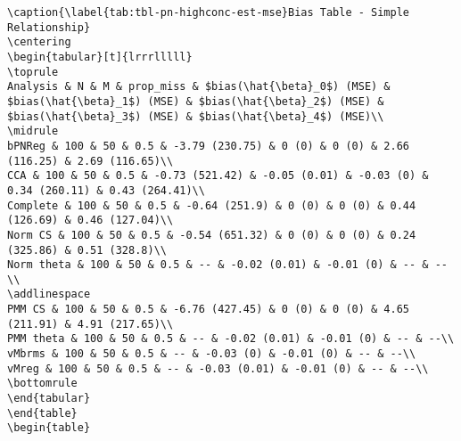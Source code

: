 \documentclass[
]{article}
\begin{document}
\begin{table}
\begin{minipage}[t]{\linewidth}
{\begin{verbatim}
\caption{\label{tab:tbl-pn-highconc-est-mse}Bias Table - Simple Relationship}
\centering
\begin{tabular}[t]{lrrrlllll}
\toprule
Analysis & N & M & prop_miss & $bias(\hat{\beta}_0$) (MSE) & $bias(\hat{\beta}_1$) (MSE) & $bias(\hat{\beta}_2$) (MSE) & $bias(\hat{\beta}_3$) (MSE) & $bias(\hat{\beta}_4$) (MSE)\\
\midrule
bPNReg & 100 & 50 & 0.5 & -3.79 (230.75) & 0 (0) & 0 (0) & 2.66 (116.25) & 2.69 (116.65)\\
CCA & 100 & 50 & 0.5 & -0.73 (521.42) & -0.05 (0.01) & -0.03 (0) & 0.34 (260.11) & 0.43 (264.41)\\
Complete & 100 & 50 & 0.5 & -0.64 (251.9) & 0 (0) & 0 (0) & 0.44 (126.69) & 0.46 (127.04)\\
Norm CS & 100 & 50 & 0.5 & -0.54 (651.32) & 0 (0) & 0 (0) & 0.24 (325.86) & 0.51 (328.8)\\
Norm theta & 100 & 50 & 0.5 & -- & -0.02 (0.01) & -0.01 (0) & -- & --\\
\addlinespace
PMM CS & 100 & 50 & 0.5 & -6.76 (427.45) & 0 (0) & 0 (0) & 4.65 (211.91) & 4.91 (217.65)\\
PMM theta & 100 & 50 & 0.5 & -- & -0.02 (0.01) & -0.01 (0) & -- & --\\
vMbrms & 100 & 50 & 0.5 & -- & -0.03 (0) & -0.01 (0) & -- & --\\
vMreg & 100 & 50 & 0.5 & -- & -0.03 (0.01) & -0.01 (0) & -- & --\\
\bottomrule
\end{tabular}
\end{table}
\begin{table}


\end{verbatim}}
\end{minipage}
\end{table}
\end{document}
